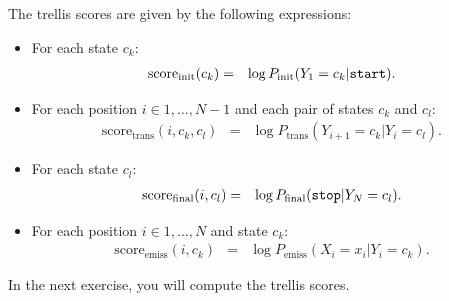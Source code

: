 The trellis scores are given by the following expressions:
\begin{itemize}
\item For each state $c_k$:
\begin{eqnarray}
\mathrm{score}_{\mathrm{init}}(c_k) &=&
\log P_{\mathrm{init}}(Y_{1} = c_k | \text{\tt start}).
\end{eqnarray}
\item For each position $i \in {1,\ldots,N-1}$ and each pair of states $c_k$ and $c_l$:
\begin{eqnarray}
\mathrm{score}_{\mathrm{trans}}(i, c_k, c_l) &=&
\log P_{\mathrm{trans}}(Y_{i+1} = c_k | Y_i = c_l).
\end{eqnarray}
\item For each state $c_l$:
\begin{eqnarray}
\mathrm{score}_{\mathrm{final}}(i, c_l) &=&
\log P_{\mathrm{final}}(\text{\tt stop} | Y_N = c_l).
\end{eqnarray}
\item For each position $i \in {1,\ldots,N}$ and state $c_k$:
\begin{eqnarray}
\mathrm{score}_{\mathrm{emiss}}(i, c_k) &=&
\log P_{\mathrm{emiss}}(X_i = x_i | Y_i = c_k).
\end{eqnarray}
\end{itemize}

In the next exercise, you will compute the trellis scores.

